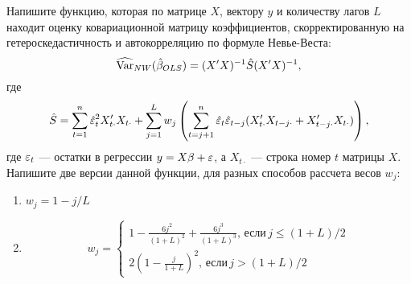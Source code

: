 \begin{problem}
Напишите функцию, которая по матрице $X$, вектору $y$ и количеству лагов $L$ находит оценку ковариационной матрицу  коэффициентов, скорректированную на гетероскедастичность и автокорреляцию по формуле Невье-Веста:
\[
\widehat{\operatorname{Var}}_{NW}(\hat{\beta}_{OLS})=(X'X)^{-1}\hat{S}(X'X)^{-1},
\]
где
\[
\hat{S}=\sum_{t=1}^{n}\hat{\varepsilon}_t^2 X_{t\cdot}'X_{t\cdot}+
                     \sum_{j=1}^L w_j \left(\sum_{t=j+1}^n  \hat{\varepsilon}_t \hat{\varepsilon}_{t-j}(X_{t\cdot}'X_{t-j\cdot}+X_{t-j\cdot}'X_{t\cdot})  \right),
\]
где $\varepsilon_t$ — остатки в регрессии $y=X\beta+\varepsilon$, а $X_{t\cdot}$ — строка номер $t$ матрицы $X$.
Напишите две версии данной функции, для разных способов рассчета весов $w_j$:
\begin{enumerate}
\item $w_j=1-j/L$
\item
\[
w_j=\begin{cases}
1-\frac{6j^2}{(1+L)^2}+\frac{6j^3}{(1+L)^3},\, \text{если}\,  j\leq (1+L)/2 \\
2\left(1-\frac{j}{1+L} \right)^2,\, \text{если}\, j>(1+L)/2
\end{cases}
\]
\end{enumerate}


\begin{sol}
\end{sol}
\end{problem}



